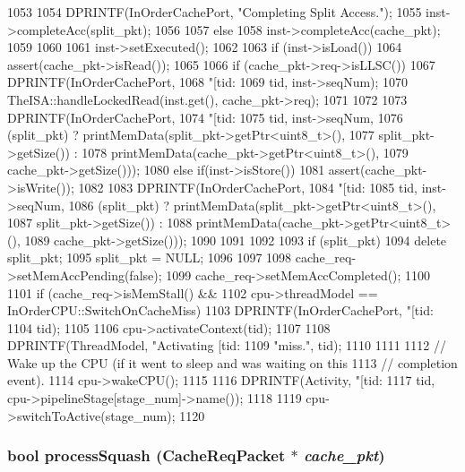 \begin{DoxyCode}
{{{1053 
1054             DPRINTF(InOrderCachePort, "Completing Split Access.\n");
1055             inst->completeAcc(split_pkt);
1056         }
1057     } else {
1058         inst->completeAcc(cache_pkt);
1059     }
1060 
1061     inst->setExecuted();
1062 
1063     if (inst->isLoad()) {
1064         assert(cache_pkt->isRead());
1065 
1066         if (cache_pkt->req->isLLSC()) {
1067             DPRINTF(InOrderCachePort,
1068                     "[tid:%
1069                     tid, inst->seqNum);
1070             TheISA::handleLockedRead(inst.get(), cache_pkt->req);
1071         }
1072 
1073         DPRINTF(InOrderCachePort,
1074                 "[tid:%
1075                 tid, inst->seqNum,
1076                 (split_pkt) ? printMemData(split_pkt->getPtr<uint8_t>(),
1077                                            split_pkt->getSize()) :
1078                               printMemData(cache_pkt->getPtr<uint8_t>(),
1079                                            cache_pkt->getSize()));
1080     } else if(inst->isStore()) {
1081         assert(cache_pkt->isWrite());
1082 
1083         DPRINTF(InOrderCachePort,
1084                 "[tid:%
1085                 tid, inst->seqNum,
1086                 (split_pkt) ? printMemData(split_pkt->getPtr<uint8_t>(),
1087                                            split_pkt->getSize()) :
1088                               printMemData(cache_pkt->getPtr<uint8_t>(),
1089                                            cache_pkt->getSize()));
1090     }
1091 
1092 
1093     if (split_pkt) {
1094         delete split_pkt;
1095         split_pkt = NULL;
1096     }
1097 
1098     cache_req->setMemAccPending(false);
1099     cache_req->setMemAccCompleted();
1100 
1101     if (cache_req->isMemStall() &&
1102         cpu->threadModel == InOrderCPU::SwitchOnCacheMiss) {
1103         DPRINTF(InOrderCachePort, "[tid:%
1104                 tid);
1105             
1106         cpu->activateContext(tid);
1107             
1108         DPRINTF(ThreadModel, "Activating [tid:%
1109                 "miss.\n", tid);
1110     }
1111         
1112     // Wake up the CPU (if it went to sleep and was waiting on this
1113     // completion event).
1114     cpu->wakeCPU();
1115 
1116     DPRINTF(Activity, "[tid:%
1117             tid, cpu->pipelineStage[stage_num]->name());
1118 
1119     cpu->switchToActive(stage_num);
1120 }
\end{DoxyCode}
\hypertarget{classCacheUnit_a251d965e889d9bfeeb0f36bc4411d86f}{
\subsubsection[{processSquash}]{\setlength{\rightskip}{0pt plus 5cm}bool processSquash ({\bf CacheReqPacket} $\ast$ {\em cache\_\-pkt})}}
\label{classCacheUnit_a251d965e889d9bfeeb0f36bc4411d86f}



